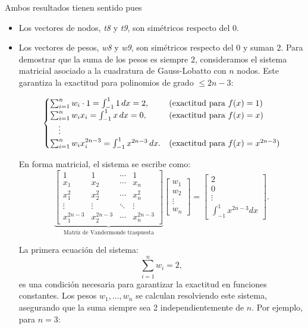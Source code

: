 \documentclass[a4paper]{article}
\begin{document}
Ambos resultados tienen sentido pues
\begin{itemize}
\item Los vectores de nodos, \textit{t8} y \textit{t9}, son simétricos respecto del 0. %
\item Los vectores de pesos, \textit{w8} y \textit{w9}, son simétricos respecto del 0 y suman 2. 
\noindent Para demostrar que la suma de los pesos es siempre 2, consideramos el sistema matricial asociado a la cuadratura de Gauss-Lobatto con \( n \) nodos. Este garantiza la exactitud para polinomios de grado \( \leq 2n-3 \):

\[
\begin{cases}
    \sum_{i=1}^n w_i \cdot 1 = \int_{-1}^1 1 \, dx = 2, & \text{(exactitud para \( f(x) = 1 \))} \\
    \sum_{i=1}^n w_i x_i = \int_{-1}^1 x \, dx = 0, & \text{(exactitud para \( f(x) = x \))} \\
    \quad \vdots & \\
    \sum_{i=1}^n w_i x_i^{2n-3} = \int_{-1}^1 x^{2n-3} \, dx. & \text{(exactitud para \( f(x) = x^{2n-3} \))}
\end{cases}
\]

\noindent En forma matricial, el sistema se escribe como:
\[
\underbrace{
\begin{bmatrix}
1 & 1 & \cdots & 1 \\
x_1 & x_2 & \cdots & x_n \\
x_1^2 & x_2^2 & \cdots & x_n^2 \\
\vdots & \vdots & \ddots & \vdots \\
x_1^{2n-3} & x_2^{2n-3} & \cdots & x_n^{2n-3}
\end{bmatrix}
}_{\text{Matriz de Vandermonde traspuesta}}
\begin{bmatrix}
w_1 \\
w_2 \\
\vdots \\
w_n
\end{bmatrix}
=
\begin{bmatrix}
2 \\
0 \\
\vdots \\
\int_{-1}^1 x^{2n-3} dx
\end{bmatrix}.
\]

\noindent La primera ecuación del sistema:
\[
\sum_{i=1}^n w_i = 2,
\]
es una condición necesaria para garantizar la exactitud en funciones constantes. Los pesos \( w_1, \ldots, w_n \) se calculan resolviendo este sistema, asegurando que la suma siempre sea 2 independientemente de \( n \). Por ejemplo, para \( n=3 \):


\end{itemize}
\end{document}
